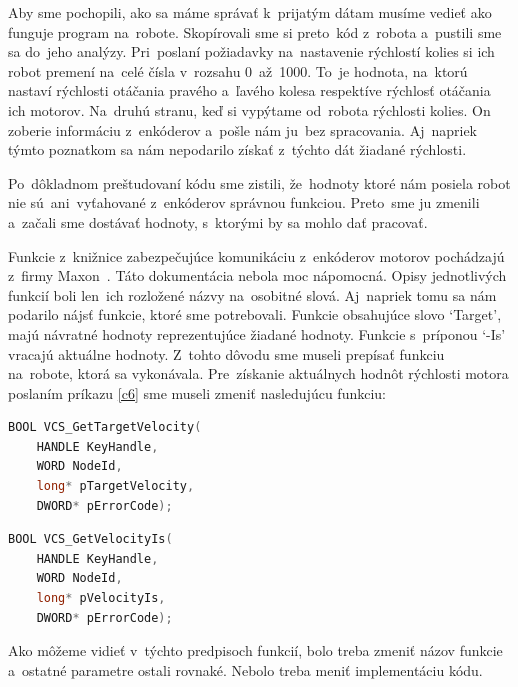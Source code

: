 Aby sme pochopili, ako sa máme správať k~prijatým dátam musíme vedieť ako funguje program na~robote.
Skopírovali sme si preto~kód z~robota a~pustili sme sa do~jeho analýzy. Pri~poslaní požiadavky
na~nastavenie rýchlostí kolies si ich robot premení na~celé čísla v~rozsahu 0~až~1000. To~je hodnota, na~ktorú nastaví
rýchlosti otáčania pravého a~ľavého kolesa respektíve rýchlosť otáčania ich motorov. Na~druhú stranu,
keď si vypýtame od~robota rýchlosti kolies. On zoberie informáciu z~enkóderov a~pošle nám ju~bez spracovania. Aj~napriek týmto poznatkom sa nám
nepodarilo získať z~týchto dát žiadané rýchlosti.

Po~dôkladnom preštudovaní kódu sme zistili, že~hodnoty ktoré nám posiela robot nie sú~ani~vyťahované z~enkóderov správnou funkciou. Preto~sme ju
zmenili a~začali sme dostávať hodnoty, s~ktorými by sa mohlo dať pracovať.

Funkcie z~knižnice zabezpečujúce komunikáciu z~enkóderov motorov pochádzajú z~firmy Maxon~\cite{EPOSdoc}. Táto dokumentácia nebola moc nápomocná.
Opisy jednotlivých funkcií boli len~ich rozložené názvy na~osobitné slová. Aj~napriek tomu sa nám podarilo nájsť funkcie, ktoré sme potrebovali.
Funkcie obsahujúce slovo `Target', majú návratné hodnoty reprezentujúce žiadané hodnoty. Funkcie s~príponou
`-Is' vracajú aktuálne hodnoty. Z~tohto dôvodu sme museli prepísať funkciu na~robote, ktorá sa vykonávala.
Pre~získanie aktuálnych hodnôt rýchlosti motora poslaním príkazu \ref{c6} sme museli zmeniť nasledujúcu funkciu:


\label{VelocityIs}
\begin{lstlisting}[language=C++]
BOOL VCS_GetTargetVelocity(
	HANDLE KeyHandle,
	WORD NodeId,
	long* pTargetVelocity,
	DWORD* pErrorCode);
\end{lstlisting}

\begin{lstlisting}[language=C++]
BOOL VCS_GetVelocityIs(
	HANDLE KeyHandle,
	WORD NodeId,
	long* pVelocityIs,
	DWORD* pErrorCode);
\end{lstlisting}

\noindent Ako môžeme vidieť v~týchto predpisoch funkcií, bolo treba zmeniť názov funkcie a~ostatné parametre ostali rovnaké.
Nebolo treba meniť implementáciu kódu.

